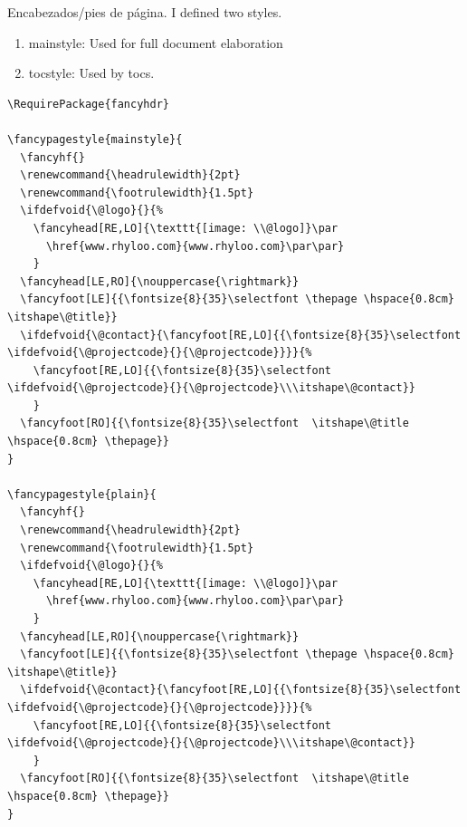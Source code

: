 \documentclass[english]{reporti}
\begin{document}
Encabezados/pies de página. I defined two styles.
\begin{enumerate}
\item mainstyle: Used for full document elaboration
\item tocstyle: Used by tocs.
\end{enumerate}
\begin{verbatim}
\RequirePackage{fancyhdr}

\fancypagestyle{mainstyle}{
  \fancyhf{}
  \renewcommand{\headrulewidth}{2pt}
  \renewcommand{\footrulewidth}{1.5pt}
  \ifdefvoid{\@logo}{}{%
    \fancyhead[RE,LO]{\texttt{[image: \\@logo]}\par
      \href{www.rhyloo.com}{www.rhyloo.com}\par\par}
    }
  \fancyhead[LE,RO]{\nouppercase{\rightmark}}
  \fancyfoot[LE]{{\fontsize{8}{35}\selectfont \thepage \hspace{0.8cm} \itshape\@title}}
  \ifdefvoid{\@contact}{\fancyfoot[RE,LO]{{\fontsize{8}{35}\selectfont \ifdefvoid{\@projectcode}{}{\@projectcode}}}}{%
    \fancyfoot[RE,LO]{{\fontsize{8}{35}\selectfont \ifdefvoid{\@projectcode}{}{\@projectcode}\\\itshape\@contact}}
    }
  \fancyfoot[RO]{{\fontsize{8}{35}\selectfont  \itshape\@title \hspace{0.8cm} \thepage}}
}

\fancypagestyle{plain}{
  \fancyhf{}
  \renewcommand{\headrulewidth}{2pt}
  \renewcommand{\footrulewidth}{1.5pt}
  \ifdefvoid{\@logo}{}{%
    \fancyhead[RE,LO]{\texttt{[image: \\@logo]}\par
      \href{www.rhyloo.com}{www.rhyloo.com}\par\par}
    }
  \fancyhead[LE,RO]{\nouppercase{\rightmark}}
  \fancyfoot[LE]{{\fontsize{8}{35}\selectfont \thepage \hspace{0.8cm} \itshape\@title}}
  \ifdefvoid{\@contact}{\fancyfoot[RE,LO]{{\fontsize{8}{35}\selectfont \ifdefvoid{\@projectcode}{}{\@projectcode}}}}{%
    \fancyfoot[RE,LO]{{\fontsize{8}{35}\selectfont \ifdefvoid{\@projectcode}{}{\@projectcode}\\\itshape\@contact}}
    }
  \fancyfoot[RO]{{\fontsize{8}{35}\selectfont  \itshape\@title \hspace{0.8cm} \thepage}}
}


\end{verbatim}
\end{document}

